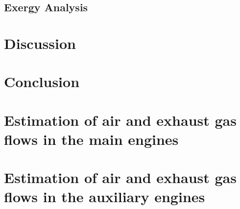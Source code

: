 \documentclass[preprint,12pt]{elsarticle}
\begin{document}
\subsection{Exergy Analysis} \label{sec:res:exergy}





\section{Discussion}
\label{sec:discussion}


\section{Conclusion}
\label{sec:conclusion}

\appendix

\section{Estimation of air and exhaust gas flows in the main engines}

\section{Estimation of air and exhaust gas flows in the auxiliary engines}




\end{document}
